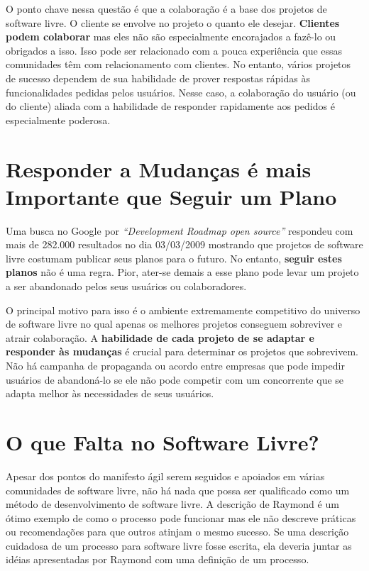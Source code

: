 O ponto chave nessa questão é que a colaboração é a base dos projetos
de software livre.  O cliente se envolve no projeto o quanto ele
desejar. \textbf{Clientes podem colaborar} mas eles não são
especialmente encorajados a fazê-lo ou obrigados a isso. Isso pode ser
relacionado com a pouca experiência que essas comunidades têm com
relacionamento com clientes. No entanto, vários projetos de sucesso
dependem de sua habilidade de prover respostas rápidas às
funcionalidades pedidas pelos usuários. Nesse caso, a colaboração do
usuário (ou do cliente) aliada com a habilidade de responder
rapidamente aos pedidos é especialmente poderosa.

\section{Responder a Mudanças é mais Importante que Seguir um Plano}
\label{sec:fourth-princ}

Uma busca no Google por \emph{``Development Roadmap open source''}
respondeu com mais de 282.000 resultados no dia 03/03/2009 mostrando
que projetos de software livre costumam publicar seus planos para o
futuro. No entanto, \textbf{seguir estes planos} não é uma
regra. Pior, ater-se demais a esse plano pode levar um projeto a ser
abandonado pelos seus usuários ou colaboradores.

O principal motivo para isso é o ambiente extremamente competitivo do
universo de software livre no qual apenas os melhores projetos
conseguem sobreviver e atrair colaboração. A \textbf{habilidade de
  cada projeto de se adaptar e responder às mudanças} é crucial para
determinar os projetos que sobrevivem. Não há campanha de propaganda
ou acordo entre empresas que pode impedir usuários de abandoná-lo se
ele não pode competir com um concorrente que se adapta melhor às
necessidades de seus usuários.

\section{O que Falta no Software Livre?}
\label{sec:os-summary}

Apesar dos pontos do manifesto ágil serem seguidos e apoiados em
várias comunidades de software livre, não há nada que possa ser
qualificado como um método de desenvolvimento de software livre. A
descrição de Raymond \cite{Raymond1999} é um ótimo exemplo de como o
processo pode funcionar mas ele não descreve práticas ou recomendações
para que outros atinjam o mesmo sucesso. Se uma descrição cuidadosa de
um processo para software livre fosse escrita, ela deveria juntar as
idéias apresentadas por Raymond com uma definição de um processo.


